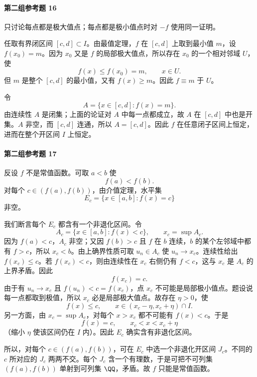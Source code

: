 \paragraph{第二组参考题 16}
\begin{xsolution}
只讨论每点都是极大值点；每点都是极小值点时对 $-f$ 使用同一证明。

任取有界闭区间 $[c,d]\subset I$。由最值定理，$f$ 在 $[c,d]$ 上取到最小值 $m$，设 $f(x_0)=m$。因为 $x_0$ 又是 $f$ 的局部极大值点，所以存在 $x_0$ 的一个相对邻域 $U$，使
\[
 f(x)\le f(x_0)=m,
 \qquad x\in U.
\]
但 $m$ 是整个 $[c,d]$ 的最小值，又有 $f(x)\ge m$。因此 $f\equiv m$ 于 $U$。

令
\[
 A=\{x\in[c,d]:f(x)=m\}.
\]
由连续性 $A$ 是闭集；上面的论证对 $A$ 中每一点都成立，故 $A$ 在 $[c,d]$ 中也是开集。$A$ 非空，而 $[c,d]$ 连通，所以 $A=[c,d]$。因此 $f$ 在任意闭子区间上恒定，进而在整个开区间 $I$ 上恒定。
\end{xsolution}

\paragraph{第二组参考题 17}
\begin{xsolution}
反设 $f$ 不是常值函数。可取 $a<b$ 使
\[
 f(a)<f(b).
\]
对每个 $c\in(f(a),f(b))$，由介值定理，水平集
\[
 E_c=\{x\in[a,b]:f(x)=c\}
\]
非空。

我们断言每个 $E_c$ 都含有一个非退化区间。令
\[
 A_c=\{x\in[a,b]:f(x)<c\},
 \qquad x_c=\sup A_c.
\]
因为 $f(a)<c$，$A_c$ 非空；又因 $f(b)>c$ 且 $f$ 在 $b$ 连续，$b$ 的某个左邻域中都有 $f>c$，所以 $x_c<b$。由上确界性质可取 $u_n\in A_c$ 使 $u_n\to x_c$。连续性给出 $f(x_c)\le c$。若 $f(x_c)<c$，则由连续性在 $x_c$ 右侧仍有 $f<c$，这与 $x_c$ 是 $A_c$ 的上界矛盾。因此
\[
 f(x_c)=c.
\]
由于有 $u_n\to x_c$ 且 $f(u_n)<c=f(x_c)$，点 $x_c$ 不可能是局部极小值点。题设说每一点都取到极值，所以 $x_c$ 必是局部极大值点。故存在 $\eta>0$，使
\[
 f(x)\le c,
 \qquad x\in(x_c-\eta,x_c+\eta)\cap I.
\]
另一方面，由 $x_c=\sup A_c$，对每个 $x>x_c$ 都不可能有 $f(x)<c$。于是
\[
 f(x)=c,
 \qquad x_c<x<x_c+\eta
\]
（缩小 $\eta$ 使该区间仍在 $I$ 内）。因此 $E_c$ 确实含有非退化区间。

所以，对每个 $c\in(f(a),f(b))$，可在 $E_c$ 中选一个非退化开区间 $J_c$。不同的 $c$ 所对应的 $J_c$ 两两不交。每个 $J_c$ 含一个有理数，于是可把不可列集 $(f(a),f(b))$ 单射到可列集 $\QQ$，矛盾。故 $f$ 只能是常值函数。
\end{xsolution}

